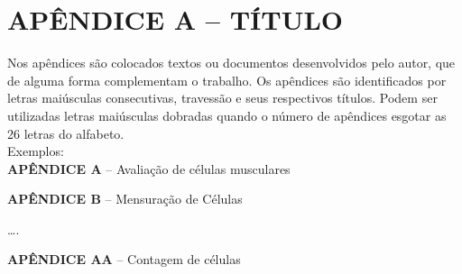 
\chapter*{\textbf{APÊNDICE A – TÍTULO}} %


Nos apêndices são colocados textos ou documentos desenvolvidos pelo autor, que de alguma forma complementam o trabalho. Os apêndices são identificados por letras maiúsculas consecutivas, travessão e seus respectivos títulos. Podem ser utilizadas letras maiúsculas dobradas quando o número de apêndices esgotar as 26 letras do alfabeto.\\

\noindent
Exemplos:\\

\textbf{APÊNDICE A} – Avaliação de células musculares

\textbf{APÊNDICE B} – Mensuração de Células

….

\textbf{APÊNDICE AA} – Contagem de células

